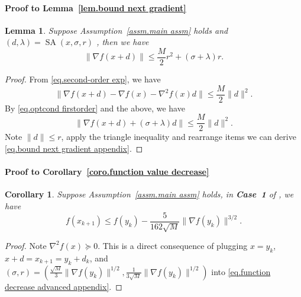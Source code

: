 \documentclass{article}
\theoremstyle{plain}
\newtheorem{lemma}[theorem]{Lemma}
\newtheorem{corollary}[theorem]{Corollary}
\theoremstyle{definition}
\theoremstyle{remark}
\begin{document}
\paragraph{Proof to Lemma~\ref{lem.bound next gradient}}
\begin{lemma}
    \label{lem.bound next gradient appendix}
    Suppose Assumption~\ref{assm.main assm} holds and $(d,\lambda)= \operatorname{SA}(x,\sigma,r)$ , then we have
    \begin{equation}
        \label{eq.bound next gradient appendix}
        \|\nabla f(x+d)\| \leq \frac{M}{2}r^2+(\sigma+\lambda)r.
    \end{equation}
\end{lemma}
\begin{proof}
    From \eqref{eq.second-order exp}, we have
    \begin{equation*}
        \|\nabla f(x+d)- \nabla f(x) -\nabla ^2 f(x) d\| \leq \frac{M}{2}\|d\|^2.
    \end{equation*}
    By \eqref{eq.optcond firstorder} and the above, we have
    \begin{equation*}
        \|\nabla f(x+d)+(\sigma+\lambda) d\| \leq \frac{M}{2}\|d\|^2.
    \end{equation*}
    Note $\|d\|\leq r$, apply the triangle inequality and rearrange items we can derive \eqref{eq.bound next gradient appendix}.
\end{proof}
\paragraph{Proof to Corollary~\ref{coro.function value decrease}}
\begin{corollary}\label{coro.function value decrease appendix}
    Suppose Assumption~\ref{assm.main assm} holds, in \textbf{Case~1} of , we have
    \begin{equation}
        \label{eq.decrease of order 1.5 appendix}
        f(x_{k+1}) \leq f(y_k)-\frac{5}{162\sqrt{M}}\|\nabla f(y_k)\|^{3/2}.
    \end{equation}
\end{corollary}
\begin{proof}
    Note $\nabla^2 f(x)\succeq 0$. This is a direct consequence of plugging $x=y_k$, $x+d =x_{k+1}= y_k+d_k$, and $(\sigma,r) = (\frac{\sqrt{M}}{3}\|\nabla f(y_k)\|^{1/2},\frac{1}{3\sqrt{M}}\|\nabla f(y_k)\|^{1/2})$ into \eqref{eq.function decrease advanced appendix}.
\end{proof}
\end{document}
